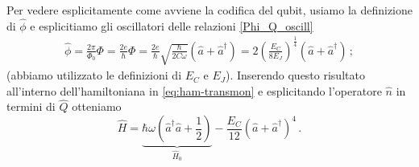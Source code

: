 \noindent Per vedere esplicitamente come avviene la codifica del qubit, usiamo la definizione di $\hat \phi$ e esplicitiamo gli oscillatori delle relazioni \eqref{Phi_Q_oscill}
\begin{align*}
    \hat \phi = \frac{2\pi}{\Phi_0}\Phi = \frac{2e}{\hbar}\Phi = \frac{2e}{\hbar}\sqrt{\frac{\hbar}{2C\omega}}\left(\hat a + \hat a^\dagger\right) = 2\left(\frac{E_C}{8E_J}\right)^{\frac 14}\left(\hat a + \hat a^\dagger\right) \, ;
\end{align*}
(abbiamo utilizzato le definizioni di $E_C$ e $E_J$). Inserendo questo risultato all'interno dell'hamiltoniana in \eqref{eq:ham-transmon} e esplicitando l'operatore $\hat{n}$ in termini di $\hat{Q}$ otteniamo
\begin{equation}\label{H_sviluppare_quartico}
    \hat H = \underbrace{\hbar\omega\left(\hat a^\dagger\hat a+\frac 12\right)}_{\hat{H}_0}-\frac{E_C}{12}\left(\hat a + \hat a^\dagger\right)^4 \, .
\end{equation}

